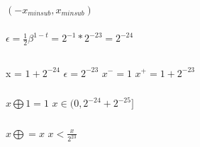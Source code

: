 \documentclass{article}
\begin{document}
    \subsubsection{}
    $(-x_{minsub},x_{minsub})$\newline

    \subsubsection{}
    $\epsilon=\frac{1}{2}\beta^{1-t}=2^{-1}*2^{-23}=2^{-24}$\newline

    \subsection{}
    \subsubsection{}
    x = $1+2^{-24}$\newline
    $\epsilon = 2^{-23}$\newline
    $x^{-} = 1$\newline
    $x^{+} = 1 + 2^{-23}$\newline
    
    \subsubsection{}
    $x \bigoplus 1 = 1$\newline
    $x \in (0,2^{-24}+2^{-25}]$\newline
    
    \subsubsection{}
    $x \bigoplus =x$\newline
    $x<\frac{x}{2^{23}}$

    \subsection{}

\end{document}
